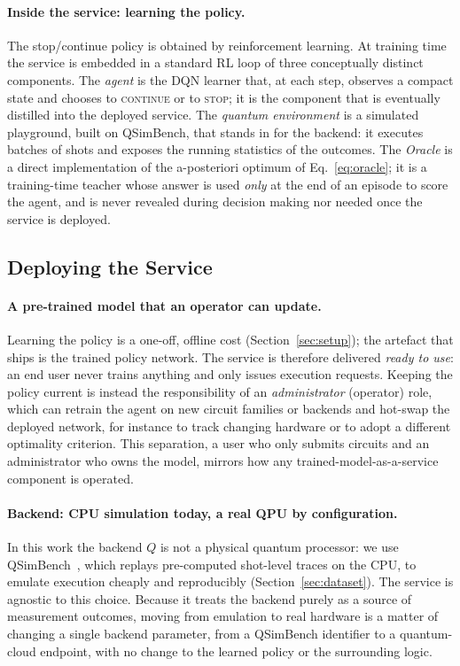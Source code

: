 \documentclass[runningheads]{llncs}
\begin{document}
\paragraph{Inside the service: learning the policy.} The stop/continue policy is
obtained by reinforcement learning. At training time the service is embedded in a
standard RL loop of three conceptually distinct components. The \emph{agent} is
the DQN learner that, at each step, observes a compact state and chooses to
\textsc{continue} or to \textsc{stop}; it is the component that is eventually
distilled into the deployed service. The \emph{quantum environment} is a
simulated playground, built on QSimBench, that stands in for the backend: it
executes batches of shots and exposes the running statistics of the outcomes. The
\emph{Oracle} is a direct implementation of the a-posteriori optimum of
Eq.~\eqref{eq:oracle}; it is a training-time teacher whose answer is used
\emph{only} at the end of an episode to score the agent, and is never revealed
during decision making nor needed once the service is deployed.

\subsection{Deploying the Service}
\label{sec:deploy}

\paragraph{A pre-trained model that an operator can update.} Learning the policy
is a one-off, offline cost (Section~\ref{sec:setup}); the artefact that ships is
the trained policy network. The service is therefore delivered \emph{ready to
use}: an end user never trains anything and only issues execution requests.
Keeping the policy current is instead the responsibility of an
\emph{administrator} (operator) role, which can retrain the agent on new circuit
families or backends and hot-swap the deployed network, for instance to track
changing hardware or to adopt a different optimality criterion. This separation,
a user who only submits circuits and an administrator who owns the model, mirrors
how any trained-model-as-a-service component is operated.

\paragraph{Backend: CPU simulation today, a real QPU by configuration.} In this
work the backend $Q$ is not a physical quantum processor: we use QSimBench~\cite{qsimbench}, which
replays pre-computed shot-level traces on the CPU, to emulate execution cheaply
and reproducibly (Section~\ref{sec:dataset}). The service is agnostic to this
choice. Because it treats the backend purely as a source of measurement outcomes,
moving from emulation to real hardware is a matter of changing a single backend
parameter, from a QSimBench identifier to a quantum-cloud endpoint, with no change
to the learned policy or the surrounding logic.
\end{document}
